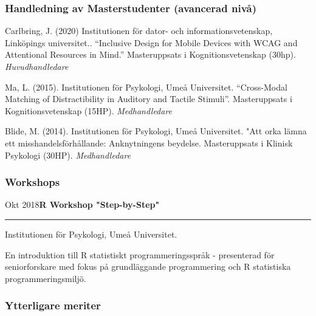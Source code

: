 \documentclass[]{article}
\begin{document}
\hypertarget{handledning-av-masterstudenter-avancerad-nivuxe5}{%
\subsubsection{Handledning av Masterstudenter (avancerad
nivå)}\label{handledning-av-masterstudenter-avancerad-nivuxe5}}

Carlbring, J. (2020) Institutionen för dator- och informationsvetenskap,
Linköpings universitet.. ``Inclusive Design for Mobile Devices with WCAG
and Attentional Resources in Mind.'' Masteruppsats i Kognitionsvetenskap
(30hp). \emph{Huvudhandledare}

Ma, L. (2015). Institutionen för Psykologi, Umeå Universitet.
``Cross-Modal Matching of Distractibility in Auditory and Tactile
Stimuli''. Masteruppsats i Kognitionsvetenskap (15HP).
\emph{Medhandledare}

Blide, M. (2014). Institutionen för Psykologi, Umeå Universitet. "Att
orka lämna ett misshandelsförhållande: Anknytningens beydelse.
Masteruppsats i Klinisk Psykologi (30HP). \emph{Medhandledare}

\hypertarget{workshops}{%
\subsubsection{Workshops}\label{workshops}}

Okt 2018\hspace{0.75cm}\textbf{R Workshop "Step-by-Step"}\vspace{1mm}

\hrule
\begin{changemargin}{2.15cm}{2.4cm}


Institutionen för Psykologi, Umeå Universitet.

En introduktion till R statistiskt programmeringsspråk - presenterad för seniorforskare med fokus på grundläggande programmering och R statistiska programmeringsmiljö.

\end{changemargin}

\hypertarget{ytterligare-meriter}{%
\subsubsection{Ytterligare meriter}\label{ytterligare-meriter}}
\end{document}
